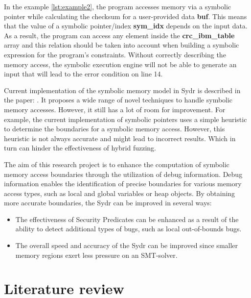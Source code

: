 \documentclass[conference]{IEEEtran}
\begin{document}
In the example \ref{lst:example2}, the program accesses memory via a symbolic pointer while calculating the checksum for a user-provided data \textbf{buf}. This means that the value of a symbolic pointer/index \textbf{sym\_idx} depends on the input data. As a result, the program can access any element inside the \textbf{crc\_ibm\_table} array and this relation should be taken into account when building a symbolic expression for the program's constraints. Without correctly describing the memory access, the symbolic execution engine will not be able to generate an input that will lead to the error condition on line 14.

Current implementation of the symbolic memory model in Sydr is described in the paper: \cite{symbolic-pointers-reasoning}. It proposes a wide range of novel techniques to handle symbolic memory accesses. However, it still has a lot of room for improvement. For example, the current implementation of symbolic pointers uses a simple heuristic to determine the boundaries for a symbolic memory access. However, this heuristic is not always accurate and might lead to incorrect results. Which in turn can hinder the effectiveness of hybrid fuzzing.

The aim of this research project is to enhance the computation of symbolic memory access boundaries through the utilization of debug information. Debug information enables the identification of precise boundaries for various memory access types, such as local and global variables or heap objects. By obtaining more accurate boundaries, the Sydr can be improved in several ways:

\begin{itemize}
    \item The effectiveness of Security Predicates can be enhanced as a result of the ability to detect additional types of bugs, such as local out-of-bounds bugs.
    \item The overall speed and accuracy of the Sydr can be improved since smaller memory regions exert less pressure on an SMT-solver.
\end{itemize}



\section{Literature review}
\end{document}
